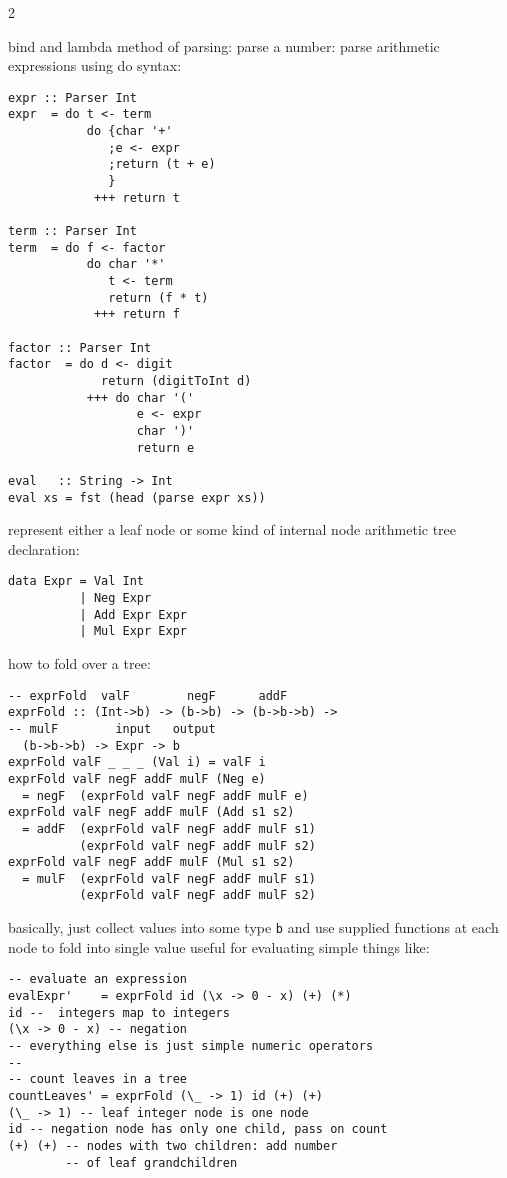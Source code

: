 \documentclass{article}
\def \columncount {2}
\begin{document}
\begin{multicols*}{\columncount}
\begin{outline}[longenum]
  \1 bind and lambda method of parsing:
    \2 parse a number:
  \1 parse arithmetic expressions using do syntax:
\begin{verbatim}
expr :: Parser Int
expr  = do t <- term
           do {char '+'
              ;e <- expr
              ;return (t + e)
              }
            +++ return t

term :: Parser Int
term  = do f <- factor
           do char '*'
              t <- term
              return (f * t)
            +++ return f

factor :: Parser Int
factor  = do d <- digit
             return (digitToInt d)
           +++ do char '('
                  e <- expr
                  char ')'
                  return e

eval   :: String -> Int
eval xs = fst (head (parse expr xs))
\end{verbatim}

  \1 represent either a leaf node or some kind of internal node
  \1 arithmetic tree declaration:
\begin{verbatim}
data Expr = Val Int
          | Neg Expr 
          | Add Expr Expr 
          | Mul Expr Expr
\end{verbatim}
  \1 how to fold over a tree:
\begin{verbatim}
-- exprFold  valF        negF      addF     
exprFold :: (Int->b) -> (b->b) -> (b->b->b) ->
-- mulF        input   output
  (b->b->b) -> Expr -> b
exprFold valF _ _ _ (Val i) = valF i
exprFold valF negF addF mulF (Neg e) 
  = negF  (exprFold valF negF addF mulF e)
exprFold valF negF addF mulF (Add s1 s2) 
  = addF  (exprFold valF negF addF mulF s1)
          (exprFold valF negF addF mulF s2)
exprFold valF negF addF mulF (Mul s1 s2) 
  = mulF  (exprFold valF negF addF mulF s1) 
          (exprFold valF negF addF mulF s2)
\end{verbatim}
    \2 basically, just collect values into some type \texttt{b} and use supplied functions at each node to fold into single value
    \2 useful for evaluating simple things like:
\begin{verbatim}
-- evaluate an expression
evalExpr'    = exprFold id (\x -> 0 - x) (+) (*)
id --  integers map to integers
(\x -> 0 - x) -- negation
-- everything else is just simple numeric operators
-- 
-- count leaves in a tree
countLeaves' = exprFold (\_ -> 1) id (+) (+)
(\_ -> 1) -- leaf integer node is one node
id -- negation node has only one child, pass on count
(+) (+) -- nodes with two children: add number 
        -- of leaf grandchildren
\end{verbatim}



\end{outline}
\end{multicols*}
\end{document}
